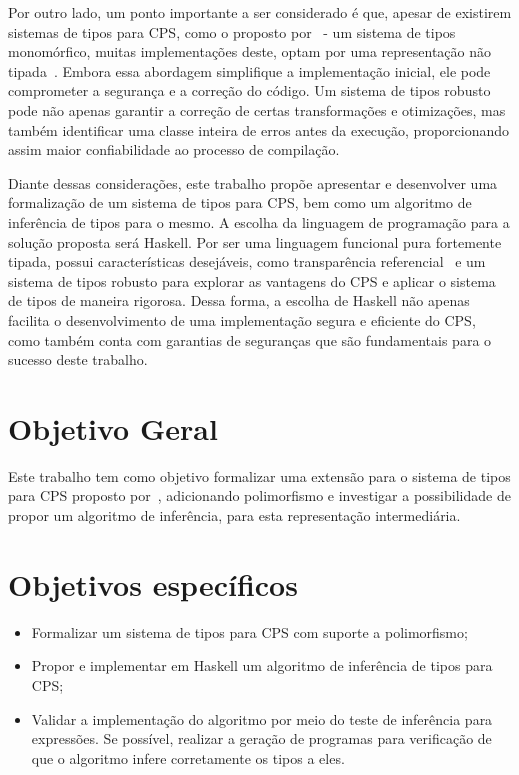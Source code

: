 Por outro lado, um ponto importante a ser considerado é que, apesar de existirem sistemas de tipos para CPS, como o proposto por~ - um sistema de tipos monomórfico, muitas implementações deste, optam por uma representação não tipada~\cite{morrisett1999systemF}.
Embora essa abordagem simplifique a implementação inicial, ele pode comprometer a segurança e a correção do código.
Um sistema de tipos robusto pode não apenas garantir a correção de certas transformações e otimizações, mas também identificar uma classe inteira de erros antes da execução, proporcionando assim maior confiabilidade ao processo de compilação.

Diante dessas considerações, este trabalho propõe apresentar e desenvolver uma formalização de um sistema de tipos para CPS, bem como um algoritmo de inferência de tipos para o mesmo.
A escolha da linguagem de programação para a solução proposta será Haskell.
Por ser uma linguagem funcional pura fortemente tipada, possui características desejáveis, como transparência referencial~\cite{sondergaard1990transparency} e um sistema de tipos robusto para explorar as vantagens do CPS e aplicar o sistema de tipos de maneira rigorosa.
Dessa forma, a escolha de Haskell não apenas facilita o desenvolvimento de uma implementação segura e eficiente do CPS, como também conta com garantias de seguranças que são fundamentais para o sucesso deste trabalho.

\section{Objetivo Geral}\label{sec:objetivo-geral}

Este trabalho tem como objetivo formalizar uma extensão para o sistema de tipos para CPS proposto por~, adicionando polimorfismo e investigar a possibilidade de propor um algoritmo de inferência, para esta representação intermediária.

\section{Objetivos específicos}\label{sec:objetivos-especificos}

\begin{itemize}
  \item Formalizar um sistema de tipos para CPS com suporte a polimorfismo;\@
  \item Propor e implementar em Haskell um algoritmo de inferência de tipos para CPS;\@
  \item Validar a implementação do algoritmo por meio do teste de inferência para expressões. Se possível, realizar a geração de programas para verificação de que o algoritmo infere corretamente os tipos a eles.
\end{itemize}


